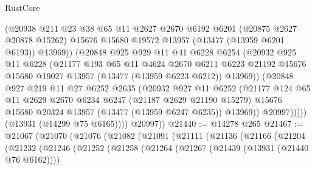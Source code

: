 \begin{lexlean}{RustCore}
\begin{coremodule}
                    (@20938
                      @211
                      @23
                      @38
                      @65
                      @11
                      @2627
                      @2670
                      @6192
                      @6201
                      (@20875 @2627 @20878 @15262)
                      @15676
                      @15680
                      @19572
                      @13957
                      (@13477 (@13959 @6201 @6193))
                      @13969))
                  (@20848
                    @925
                    @929
                    @11
                    @41
                    @6228
                    @6254
                    (@20932
                      @925
                      @11
                      @6228
                      (@21177
                        @193
                        @65
                        @11
                        @4624
                        @2670
                        @6211
                        @6223
                        @21192
                        @15676
                        @15680
                        @19027
                        @13957
                        (@13477 (@13959 @6223 @6212))
                        @13969))
                    (@20848
                      @927
                      @219
                      @11
                      @27
                      @6252
                      @2635
                      (@20932
                        @927
                        @11
                        @6252
                        (@21177
                          @124
                          @65
                          @11
                          @2629
                          @2670
                          @6234
                          @6247
                          (@21187 @2629 @21190 @15279)
                          @15676
                          @15680
                          @20324
                          @13957
                          (@13477 (@13959 @6247 @6235))
                          @13969))
                      @20997)))))
            (@13931 (@14299 @75 @6165))))
        @20997))
@21440 := @14278 @265
@21467 := @21067
    (@21070
      (@21076
        (@21082
          (@21091
            (@21111
              (@21136
                (@21166
                  (@21204
                    (@21232
                      (@21246
                        (@21252
                          (@21258
                            (@21264
                              (@21267 (@21439 (@13931 (@21440 @76 @6162))))

\end{coremodule}
\end{lexlean}
